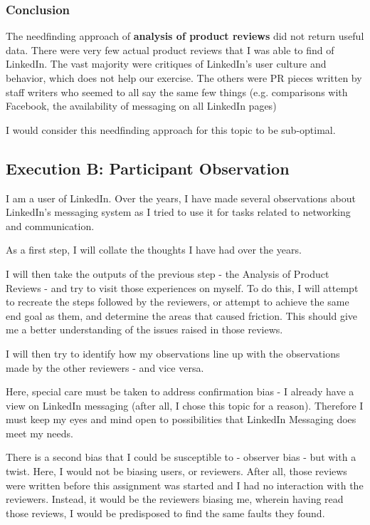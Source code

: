 \documentclass[
	letterpaper, %
]{jdf}
\begin{document}
\subsubsection{Conclusion}
The needfinding approach of \textbf{analysis of product reviews} did not return useful data.
There were very few actual product reviews that I was able to find of LinkedIn. The vast majority were critiques of LinkedIn's user culture and behavior, which does not help our exercise. The others were PR pieces written by staff writers who seemed to all say the same few things (e.g. comparisons with Facebook, the availability of messaging on all LinkedIn pages)

I would consider this needfinding approach for this topic to be sub-optimal.

\subsection{Execution B: Participant Observation}
I am a user of LinkedIn. Over the years, I have made several observations about LinkedIn's messaging system as I tried to use it for tasks related to networking and communication.

As a first step, I will collate the thoughts I have had over the years.

I will then take the outputs of the previous step - the Analysis of Product Reviews - and try to visit those experiences on myself. To do this, I will attempt to recreate the steps followed by the reviewers, or attempt to achieve the same end goal as them, and determine the areas that caused friction. This should give me a better understanding of the issues raised in those reviews.

I will then try to identify how my observations line up with the observations made by the other reviewers - and vice versa.

Here, special care must be taken to address confirmation bias - I already have a view on LinkedIn messaging (after all, I chose this topic for a reason). Therefore I must keep my eyes and mind open to possibilities that LinkedIn Messaging does meet my needs.

There is a second bias that I could be susceptible to - observer bias - but with a twist. Here, I would not be biasing users, or reviewers. After all, those reviews were written before this assignment was started and I had no interaction with the reviewers. Instead, it would be the reviewers biasing me, wherein having read those reviews, I would be predisposed to find the same faults they found.
\end{document}

